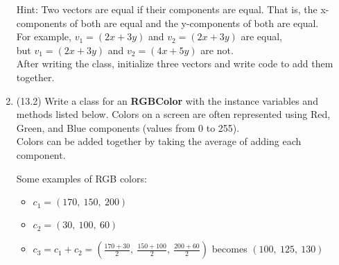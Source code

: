 \documentclass{article}
\begin{document}
\begin{enumerate}
		Hint: Two vectors are equal if their components are equal. That is, the x-components 
		of both are equal and the y-components of both are equal.\\
		For example, $v_1 =(2x + 3y)$ and $v_2=(2x + 3y)$ are equal, \\
		but $v_1=(2x + 3y)$ and $v_2=(4x + 5y)$ are not.\\[0.5em]
		After writing the class, initialize three vectors and write code to add them together.





\item (13.2)
		Write a class for an \textbf{RGBColor} with the instance variables and methods listed 
		below. Colors on a screen are often represented using Red, Green, and Blue components 
		(values from 0 to 255).\\
		Colors can be added together by taking the average of adding each component.

		\begin{minipage}[t]{0.7\textwidth}
			Some examples of RGB colors:
			\begin{itemize}
				\item $c_1 = (170,\ 150,\ 200)$
				\item $c_2 = (30,\ 100,\ 60)$
				\item $c_3 = c_1 + c_2 = (\frac{170+30}{2},\ \frac{150+100}{2},\ \frac{200+60}{2})$ 
					becomes $(100,\ 125,\ 130)$
			\end{itemize}
		

\end{minipage}
\end{enumerate}
\end{document}
